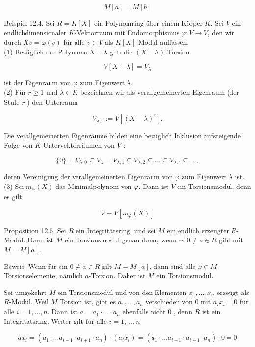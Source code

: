 \documentclass[10pt, letterpaper]{article}
\begin{document}
$$
M[a]=M[b]
$$

Beispiel 12.4. Sei $R=K[X]$ ein Polynomring über einem Körper $K$. Sei $V$ ein endlichdimensionaler $K$-Vektorraum mit Endomorphismus $\varphi: V \rightarrow V$, den wir durch $X v=\varphi(v)$ für alle $v \in V$ als $K[X]$-Modul auffassen.\\
(1) Bezüglich des Polynoms $X-\lambda$ gilt: die $(X-\lambda)$-Torsion

$$
V[X-\lambda]=V_{\lambda}
$$

ist der Eigenraum von $\varphi$ zum Eigenwert $\lambda$.\\
(2) Für $r \geq 1$ und $\lambda \in K$ bezeichnen wir als verallgemeinerten Eigenraum (der Stufe $r$ ) den Unterraum

$$
V_{\lambda, r}:=V\left[(X-\lambda)^{r}\right] .
$$

Die verallgemeinerten Eigenräume bilden eine bezüglich Inklusion aufsteigende Folge von $K$-Untervektorräumen von $V$ :

$$
\{0\}=V_{\lambda, 0} \subseteq V_{\lambda}=V_{\lambda, 1} \subseteq V_{\lambda, 2} \subseteq \ldots \subseteq V_{\lambda, r} \subseteq \ldots,
$$

deren Vereinigung der verallgemeinerten Eigenraum von $\varphi$ zum Eigenwert $\lambda$ ist.\\
(3) Sei $m_{\varphi}(X)$ das Minimalpolynom von $\varphi$. Dann ist $V$ ein Torsionsmodul, denn es gilt

$$
V=V\left[m_{\varphi}(X)\right]
$$

Proposition 12.5. Sei $R$ ein Integritätsring, und sei $M$ ein endlich erzeugter $R$-Modul. Dann ist $M$ ein Torsionsmodul genau dann, wenn es $0 \neq a \in R$ gibt mit $M=M[a]$.

Beweis. Wenn für ein $0 \neq a \in R$ gilt $M=M[a]$, dann sind alle $x \in M$ Torsionselemente, nämlich $a$-Torsion. Daher ist $M$ ein Torsionsmodul.

Sei umgekehrt $M$ ein Torsionsmodul und von den Elementen $x_{1}, \ldots, x_{n}$ erzeugt als $R$-Modul. Weil $M$ Torsion ist, gibt es $a_{1}, \ldots, a_{n}$ verschieden von 0 mit $a_{i} x_{i}=0$ für alle $i=1, \ldots, n$. Dann ist $a=a_{1} \cdot \ldots \cdot a_{n}$ ebenfalls nicht 0 , denn $R$ ist ein Integritätsring. Weiter gilt für alle $i=1, \ldots, n$

$$
a x_{i}=\left(a_{1} \cdot \ldots a_{i-1} \cdot a_{i+1} \cdot a_{n}\right) \cdot\left(a_{i} x_{i}\right)=\left(a_{1} \cdot \ldots a_{i-1} \cdot a_{i+1} \cdot a_{n}\right) \cdot 0=0
$$
\end{document}
